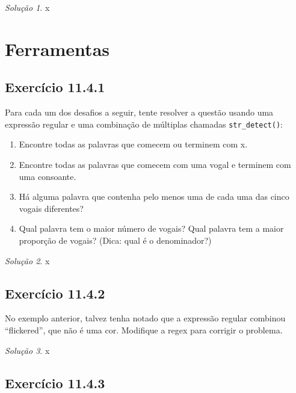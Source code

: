 \documentclass[
]{latex/krantz}
\providecommand{\tightlist}{%
  \setlength{\itemsep}{0pt}\setlength{\parskip}{0pt}}
\theoremstyle{definition}
\theoremstyle{definition}
\theoremstyle{definition}
\theoremstyle{definition}
\theoremstyle{remark}
\newtheorem*{solution}{Solução}
\begin{document}
\begin{solution}
x
\end{solution}

\hypertarget{ferramentas}{%
\section{Ferramentas}\label{ferramentas}}

\hypertarget{exr11-4-1}{%
\subsection*{Exercício 11.4.1}\label{exr11-4-1}}

Para cada um dos desafios a seguir, tente resolver a questão usando uma expressão regular e uma combinação de múltiplas chamadas \texttt{str\_detect()}:

\begin{enumerate}
\def\labelenumi{\alph{enumi}.}
\tightlist
\item
  Encontre todas as palavras que comecem ou terminem com x.
\item
  Encontre todas as palavras que comecem com uma vogal e terminem com uma consoante.
\item
  Há alguma palavra que contenha pelo menos uma de cada uma das cinco vogais diferentes?
\item
  Qual palavra tem o maior número de vogais? Qual palavra tem a maior proporção de vogais? (Dica: qual é o denominador?)
\end{enumerate}

\begin{solution}
x
\end{solution}

\hypertarget{exr11-4-2}{%
\subsection*{Exercício 11.4.2}\label{exr11-4-2}}

No exemplo anterior, talvez tenha notado que a expressão regular combinou ``flickered'', que não é uma cor. Modifique a regex para corrigir o problema.

\begin{solution}
x
\end{solution}

\hypertarget{exr11-4-3}{%
\subsection*{Exercício 11.4.3}\label{exr11-4-3}}
\end{document}
